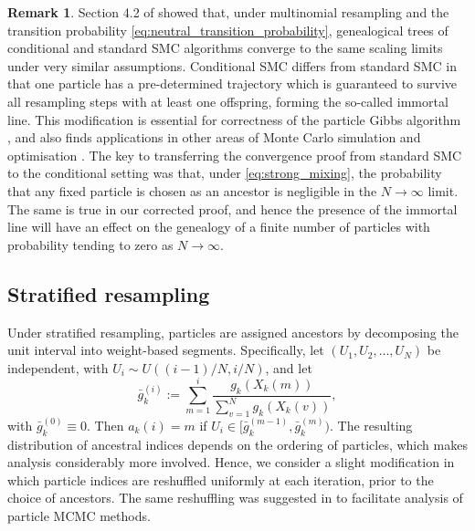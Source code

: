 \documentclass[a4paper,11pt]{article}
\theoremstyle{definition}
\newtheorem{rem}{Remark}
\begin{document}
\begin{rem}
Section 4.2 of \cite{brownetal:2021} showed that, under multinomial resampling and the transition probability \eqref{eq:neutral_transition_probability}, genealogical trees of conditional and standard SMC algorithms converge to the same scaling limits under very similar assumptions.
Conditional SMC differs from standard SMC in that one particle has a pre-determined trajectory which is guaranteed to survive all resampling steps with at least one offspring, forming the so-called immortal line.
This modification is essential for correctness of the particle Gibbs algorithm \cite{andrieu2010}, and also finds applications in other areas of Monte Carlo simulation \cite{jacob19, shestopaloff19} and optimisation \cite[Chapter 6]{finke15}.
The key to transferring the convergence proof from standard SMC to the conditional setting was that, under \eqref{eq:strong_mixing}, the probability that any fixed particle is chosen as an ancestor is negligible in the $N \to \infty$ limit.
The same is true in our corrected proof, and hence the presence of the immortal line will have an effect on the genealogy of a finite number of particles with probability tending to zero as $N \to \infty$.
\end{rem}

\subsection{Stratified resampling}

Under stratified resampling, particles are assigned ancestors by decomposing the unit interval into weight-based segments.
Specifically, let $( U_1, U_2, \ldots, U_N )$ be independent, with $U_i \sim U( ( i - 1 ) / N, i / N )$, and let
\begin{equation*}
\bar{ g }_k^{ ( i ) } := \sum_{ m = 1 }^i \frac{ g_k( X_k( m ) ) }{ \sum_{ v = 1 }^N g_k( X_k( v ) ) },
\end{equation*}
with $\bar{ g }_k^{ ( 0 ) } \equiv 0$.
Then $a_k( i ) = m$ if $U_i \in [ \bar{ g }_k^{ ( m - 1 ) }, \bar{ g }_k^{ ( m ) } )$.
The resulting distribution of ancestral indices depends on the ordering of particles, which makes analysis considerably more involved.
Hence, we consider a slight modification in which particle indices are reshuffled uniformly at each iteration, prior to the choice of ancestors.
The same reshuffling was suggested in \cite[page 290]{andrieu2010} to facilitate analysis of particle MCMC methods. 
\end{document}
